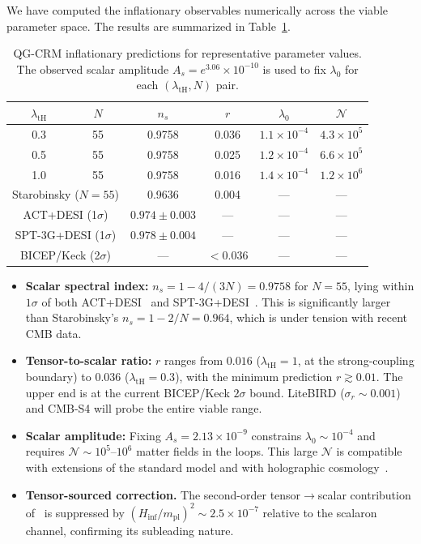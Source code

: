 \documentclass[aps,prd,twocolumn,superscriptaddress,nofootinbib]{revtex4-2}
\begin{document}
We have computed the inflationary observables numerically across the viable parameter space. The results are summarized in Table~\ref{tab:observables}.

\begin{table}[h]
\caption{QG-CRM inflationary predictions for representative parameter values. The observed scalar amplitude $A_s = e^{3.06} \times 10^{-10}$ is used to fix $\lambda_0$ for each $(\lambda_\mathrm{tH}, N)$ pair.}
\begin{tabular}{cccccc}
\toprule
$\lambda_\mathrm{tH}$ & $N$ & $n_s$ & $r$ & $\lambda_0$ & $\mathcal{N}$ \\
\midrule
0.3 & 55 & 0.9758 & 0.036 & $1.1 \times 10^{-4}$ & $4.3 \times 10^5$ \\
0.5 & 55 & 0.9758 & 0.025 & $1.2 \times 10^{-4}$ & $6.6 \times 10^5$ \\
1.0 & 55 & 0.9758 & 0.016 & $1.4 \times 10^{-4}$ & $1.2 \times 10^6$ \\
\midrule
\multicolumn{2}{c}{Starobinsky ($N=55$)} & 0.9636 & 0.004 & --- & --- \\
\multicolumn{2}{c}{ACT+DESI (1$\sigma$)} & $0.974 \pm 0.003$ & --- & --- & --- \\
\multicolumn{2}{c}{SPT-3G+DESI (1$\sigma$)} & $0.978 \pm 0.004$ & --- & --- & --- \\
\multicolumn{2}{c}{BICEP/Keck (2$\sigma$)} & --- & $<0.036$ & --- & --- \\
\bottomrule
\end{tabular}
\label{tab:observables}
\end{table}

\begin{itemize}
\item \textbf{Scalar spectral index:} $n_s = 1 - 4/(3N) = 0.9758$ for $N = 55$, lying within $1\sigma$ of both ACT+DESI~\cite{ACT2025} and SPT-3G+DESI~\cite{SPT3G2026}. This is significantly larger than Starobinsky's $n_s = 1 - 2/N = 0.964$, which is under tension with recent CMB data.

\item \textbf{Tensor-to-scalar ratio:} $r$ ranges from $0.016$ ($\lambda_\mathrm{tH} = 1$, at the strong-coupling boundary) to $0.036$ ($\lambda_\mathrm{tH} = 0.3$), with the minimum prediction $r \gtrsim 0.01$. The upper end is at the current BICEP/Keck $2\sigma$ bound. LiteBIRD ($\sigma_r \sim 0.001$) and CMB-S4 will probe the entire viable range.

\item \textbf{Scalar amplitude:} Fixing $A_s = 2.13 \times 10^{-9}$ constrains $\lambda_0 \sim 10^{-4}$ and requires $\mathcal{N} \sim 10^5$--$10^6$ matter fields in the loops. This large $\mathcal{N}$ is compatible with extensions of the standard model and with holographic cosmology~\cite{Afshordi2017}.

\item \textbf{Tensor-sourced correction.} The second-order tensor$\to$scalar contribution of~\cite{Bertacca2025} is suppressed by $(H_\mathrm{inf}/m_\mathrm{pl})^2 \sim 2.5 \times 10^{-7}$ relative to the scalaron channel, confirming its subleading nature.
\end{itemize}
\end{document}
